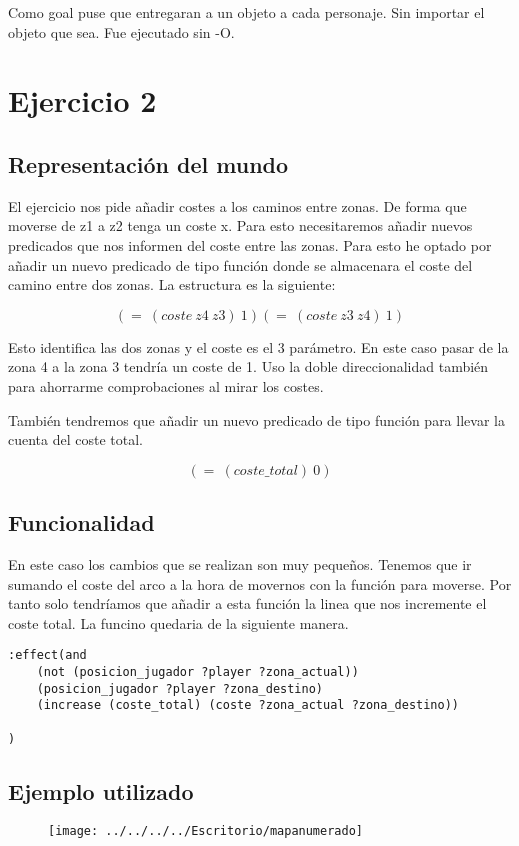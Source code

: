 \documentclass[]{article}
\begin{document}
Como goal puse que entregaran a un objeto a cada personaje. Sin importar el objeto que sea. Fue ejecutado sin -O.
\section{Ejercicio 2}
\subsection{Representación del mundo}
El ejercicio nos pide añadir costes a los caminos entre zonas. De forma que moverse de z1 a z2 tenga un coste x. Para esto necesitaremos añadir nuevos predicados que nos informen del coste entre las zonas. Para esto he optado por añadir un nuevo predicado de tipo función donde se almacenara el coste del camino entre dos zonas. La estructura es la siguiente:

$$
(=\ (coste\ z4\ z3)\ 1)
(=\ (coste\ z3\ z4)\ 1)
$$

Esto identifica las dos zonas y el coste es el 3 parámetro. En este caso pasar de la zona 4 a la zona 3 tendría un coste de 1. Uso la doble direccionalidad también para ahorrarme comprobaciones al mirar los costes.

También tendremos que añadir un nuevo predicado de tipo función para llevar la cuenta del coste total. 

$$
(=\ (coste\_total)\ 0)
$$

\subsection{Funcionalidad}
En este caso los cambios que se realizan son muy pequeños. Tenemos que ir sumando el coste del arco a la hora de movernos con la función para moverse. Por tanto solo tendríamos que añadir a esta función la linea que nos incremente el coste total. La funcino quedaria de la siguiente manera. 

\begin{lstlisting}
:effect(and 
	(not (posicion_jugador ?player ?zona_actual))
	(posicion_jugador ?player ?zona_destino)
	(increase (coste_total) (coste ?zona_actual ?zona_destino))

)
\end{lstlisting}

\subsection{Ejemplo utilizado}

\begin{figure}[H]
	\centering
	\texttt{[image: ../../../../Escritorio/mapanumerado]}
\end{figure}
\end{document}
